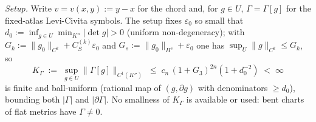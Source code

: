 \emph{Setup.} Write $v=v(x,y):=y-x$ for the chord and, for $g\in U$,
$\Gamma=\Gamma[g]$ for the fixed-atlas Levi-Civita symbols. The setup fixes
$\varepsilon_0$ so small that $d_0:=\inf_{g\in U}\min_{K''}|\det g|>0$
(uniform non-degeneracy); with $G_k:=\|g_0\|_{C^k}+C_S^{(k)}\varepsilon_0$ and
$G_s:=\|g_0\|_{H^s}+\varepsilon_0$ one has $\sup_U\|g\|_{C^k}\le G_k$, so
\begin{equation}\label{an17:eq-KGamma}
 K_\Gamma\;:=\;\sup_{g\in U}\|\Gamma[g]\|_{C^1(K'')}\;\le\;c_n\,(1+G_3)^{2n}
 (1+d_0^{-2})\;<\;\infty
\end{equation}
is finite and ball-uniform (rational map of $(g,\partial g)$ with denominators
$\ge d_0$), bounding both $|\Gamma|$ and $|\partial\Gamma|$. No smallness of
$K_\Gamma$ is available or used: bent charts of flat metrics have $\Gamma\neq0$.

